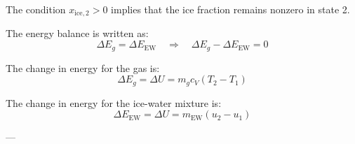 The condition \( x_{\text{ice},2} > 0 \) implies that the ice fraction remains nonzero in state 2.  

The energy balance is written as:  
\[
\Delta E_g = \Delta E_{\text{EW}} \quad \Rightarrow \quad \Delta E_g - \Delta E_{\text{EW}} = 0
\]  

The change in energy for the gas is:  
\[
\Delta E_g = \Delta U = m_g c_V (T_2 - T_1)
\]  

The change in energy for the ice-water mixture is:  
\[
\Delta E_{\text{EW}} = \Delta U = m_{\text{EW}} (u_2 - u_1)
\]  

---